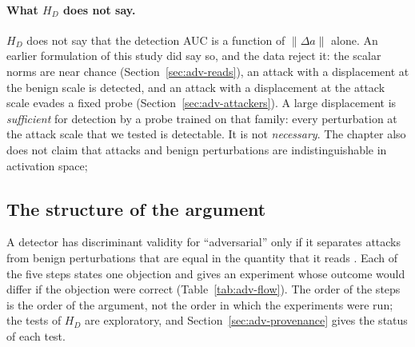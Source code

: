 \documentclass[../ppgc-tese.tex]{subfiles}
\begin{document}
\paragraph*{What $H_{D}$ does not say.}
$H_{D}$ does not say that the detection AUC is a function of
$\lVert\Delta a\rVert$ alone. An earlier formulation of this study did say so,
and the data reject it: the scalar norms are near chance
(Section~\ref{sec:adv-reads}), an attack with a displacement at the benign
scale is detected, and an attack with a displacement at the attack scale evades
a fixed probe (Section~\ref{sec:adv-attackers}). A large displacement is
\emph{sufficient} for detection by a probe trained on that family: every
perturbation at the attack scale that we tested is detectable. It is not
\emph{necessary}. The chapter also does not claim that attacks and benign
perturbations are indistinguishable in activation space;

\subsection{The structure of the argument}
\label{sec:adv-flow}

A detector has discriminant validity for ``adversarial'' only if it separates
attacks from benign perturbations that are equal in the quantity that it reads
\cite{campbell1959convergent_discriminant_validation}. Each of the five steps
states one objection and gives an experiment whose outcome would differ if the
objection were correct
\cite{platt1964strong_inference,shadish2002experimental_designs}
(Table~\ref{tab:adv-flow}). The order of the steps is the order of the
argument, not the order in which the experiments were run; the tests of $H_{D}$
are exploratory, and Section~\ref{sec:adv-provenance} gives the status of each
test.
\end{document}
